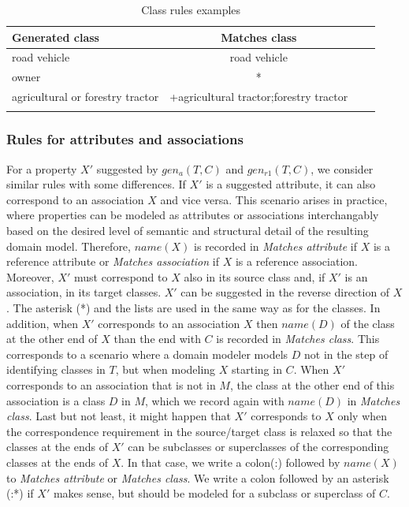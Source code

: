 \begin{table}[!h]
    \scriptsize
    \centering
    \setlength{\tabcolsep}{0.5em}
    \begin{tabular}{lccc}
     \toprule
         Generated class & Matches class \\
    \toprule
    
\addlinespace
road vehicle   & road vehicle \\
\addlinespace
owner         & * \\
\addlinespace
agricultural or forestry tractor & +agricultural tractor;forestry tractor \\
    \addlinespace
    \bottomrule
    \addlinespace
    \end{tabular}
    \caption{Class rules examples}
    \label{tab:class-rules}
\end{table}



\subsubsection{Rules for attributes and associations}

For a property $X'$ suggested by $gen_a(T,C)$ and $gen_{r1}(T,C)$, we consider similar rules with some differences.
If $X'$ is a suggested attribute, it can also correspond to an association $X$ and vice versa.
This scenario arises in practice, where properties can be modeled as attributes or associations interchangably based on the desired level of semantic and structural detail of the resulting domain model.
Therefore, $name(X)$ is recorded in \emph{Matches attribute} if $X$ is a reference attribute or \emph{Matches association} if $X$ is a reference association.
Moreover, $X'$ must correspond to $X$ also in its source class and, if $X'$ is an association, in its target classes.
$X'$ can be suggested in the reverse direction of $X$.
The asterisk (*) and the lists are used in the same way as for the classes.
In addition, when $X'$ corresponds to an association $X$ then $name(D)$ of the class at the other end of $X$ than the end with $C$ is recorded in \emph{Matches class}.
This corresponds to a scenario where a domain modeler models $D$ not in the step of identifying classes in $T$, but when modeling $X$ starting in $C$.
When $X'$ corresponds to an association that is not in $M$, the class at the other end of this association is a class $D$ in $M$, which we record again with $name(D)$ in \emph{Matches class}.
Last but not least, it might happen that $X'$ corresponds to $X$ only when the correspondence requirement in the source/target class is relaxed so that the classes at the ends of $X'$ can be subclasses or superclasses of the corresponding classes at the ends of $X$.
In that case, we write a colon(:) followed by $name(X)$ to \emph{Matches attribute} or \emph{Matches class}.
We write a colon followed by an asterisk (:*) if $X'$ makes sense, but should be modeled for a subclass or superclass of $C$.

